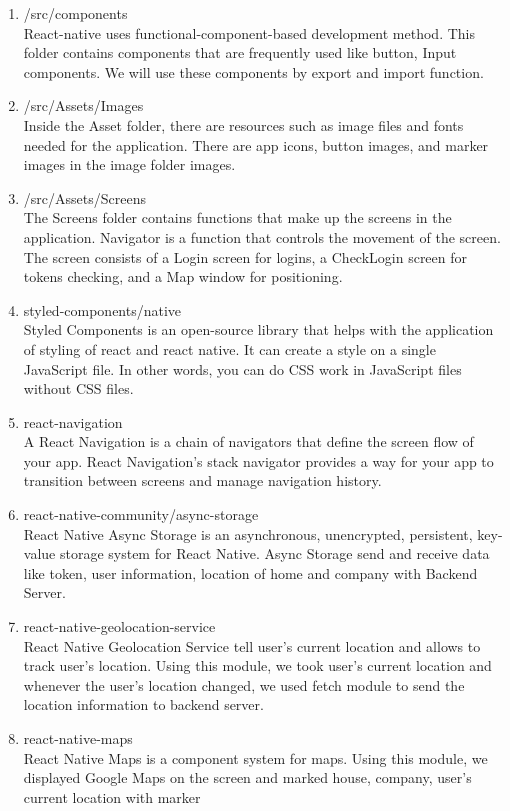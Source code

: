 \documentclass[conference]{IEEEtran}
\begin{document}
\begin{enumerate}
    \item /src/components\\
    React-native uses functional-component-based development method. This folder contains components that are frequently used like button, Input components. We will use these components by export and import function.\\
    \item /src/Assets/Images\\
    Inside the Asset folder, there are resources such as image files and fonts needed for the application. There are app icons, button images, and marker images in the image folder images.\\
    \item /src/Assets/Screens\\
    The Screens folder contains functions that make up the screens in the application. Navigator is a function that controls the movement of the screen. The screen consists of a Login screen for logins, a CheckLogin screen for tokens checking, and a Map window for positioning.\\
    \item styled-components/native\\
    Styled Components is an open-source library that helps with the application of styling of react and react native. It can create a style on a single JavaScript file. In other words, you can do CSS work in JavaScript files without CSS files.\\
    \item react-navigation\\
    A React Navigation is a chain of navigators that define the screen flow of your app. React Navigation's stack navigator provides a way for your app to transition between screens and manage navigation history.\\
    \item react-native-community/async-storage\\
    React Native Async Storage is an asynchronous, unencrypted, persistent, key-value storage system for React Native. Async Storage send and receive data like token, user information, location of home and company with Backend Server.\\
    \item react-native-geolocation-service\\
    React Native Geolocation Service tell user’s current location and allows to track user’s location. Using this module, we took user’s current location and whenever the user’s location changed, we used fetch module to send the location information to backend server.\\
    \item react-native-maps\\
    React Native Maps is a component system for maps. Using this module, we displayed Google Maps on the screen and marked house, company, user’s current location with marker\\
\end{enumerate}
\end{document}
